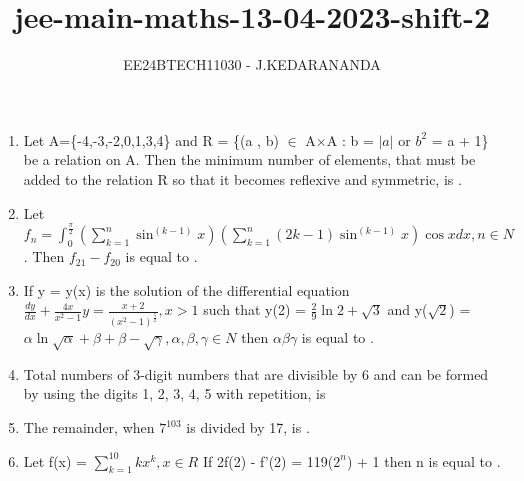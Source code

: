 \documentclass[journal]{IEEEtran}
\renewcommand{\thefigure}{\theenumi}
\renewcommand{\thetable}{\theenumi}
\numberwithin{equation}{enumi}
\numberwithin{figure}{enumi}
\renewcommand{\thetable}{\theenumi}
\begin{document}

\vspace{3cm}

\title{jee-main-maths-13-04-2023-shift-2}
\author{EE24BTECH11030 - J.KEDARANANDA}
{\let\newpage\relax\maketitle}
\renewcommand{\thefigure}{\theenumi}
\renewcommand{\thetable}{\theenumi}
\begin{enumerate}
    \item Let A=\{-4,-3,-2,0,1,3,4\} and R = \{(a , b) $\in$ A$\times$A : b = $|a|$ or $b^2$ = a + 1\} be a relation on A. Then the minimum number of elements, that must be added to the relation R so that it becomes reflexive and symmetric, is  \underline{\hspace{1cm}}.
    \bigskip
    
    \item Let $f_n = \int_{0}^{\frac{\pi}{2}}\left(\sum_{k=1}^{n}\sin^{(k - 1)}{x}\right)\left(\sum_{k=1}^{n}(2k - 1)\sin^{(k - 1)}{x}\right)\cos{x}dx , n \in N$. Then $f_{21} - f_{20}$ is equal to \underline{\hspace{1cm}}.
    \bigskip
    
    \item If y = y(x) is the solution of the differential equation 
    $\frac{dy}{dx} + \frac{4x}{x^2 - 1}y = \frac{x + 2}{(x^2 - 1)^{\frac{5}{2}}} , x > 1$ such that y(2) = $\frac{2}{9}\ln{2 + \sqrt{3}}$ and y($\sqrt{2}$) = $\alpha\ln{\sqrt{\alpha} + \beta} + \beta - \sqrt{\gamma} , \alpha,\beta,\gamma \in N$ then $\alpha\beta\gamma$ is equal to \underline{\hspace{1cm}}.
    \bigskip
    
    \item Total numbers of 3-digit numbers that are divisible by 6 and can be formed by using the digits 1, 2, 3, 4, 5 with repetition, is \underline{\hspace{1cm}}
    \bigskip
    
    \item The remainder, when $7^{103}$ is divided by 17, is \underline{\hspace{1cm}}.
    \bigskip
    
    \item Let f(x) = $\sum_{k=1}^{10}kx^k , x \in R $ If 2f(2) - f'(2) = 119($2^n$) + 1 then n is equal to \underline{\hspace{1cm}}. 
    \bigskip
    

\end{enumerate}
\end{document}

